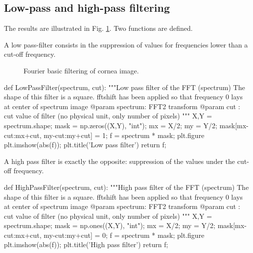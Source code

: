 \subsection{Low-pass and high-pass filtering}
The results are illustrated in Fig. \ref{fig:fourier:python:filters}. Two functions are defined.


A low pass-filter consists in the suppression of values for frequencies lower than a cut-off frequency.

\begin{figure}[H]
	\centering\caption{Fourier basic filtering of cornea image.}%
	\hfill
	\label{fig:fourier:python:filters}%
\end{figure}

 \begin{python} 
def LowPassFilter(spectrum, cut):
    """Low pass filter of the FFT (spectrum)
    The shape of this filter is a square. fftshift has been applied so that 
    frequency 0 lays at center of spectrum image
    @param spectrum: FFT2 transform
    @param cut     : cut value of filter (no physical unit, only number of pixels)
    """
    X,Y = spectrum.shape;
    mask = np.zeros((X,Y), "int");
    mx = X/2; my = Y/2;
    mask[mx-cut:mx+cut, my-cut:my+cut] = 1;
    f = spectrum * mask;
    plt.figure
    plt.imshow(abs(f)); plt.title('Low pass filter')
    return f;
\end{python}

A high pass filter is exactly the opposite: suppression of the values under the cut-off frequency.
\begin{python}
def HighPassFilter(spectrum, cut):
    """High pass filter of the FFT (spectrum)
    The shape of this filter is a square. fftshift has been applied so that 
    frequency 0 lays at center of spectrum image
    @param spectrum: FFT2 transform
    @param cut     : cut value of filter (no physical unit, only number of pixels)
    """
    X,Y = spectrum.shape;
    mask = np.ones((X,Y), "int");
    mx = X/2; my = Y/2;
    mask[mx-cut:mx+cut, my-cut:my+cut] = 0;
    f = spectrum * mask;
    plt.figure
    plt.imshow(abs(f)); plt.title('High pass filter')
    return f;
\end{python}


